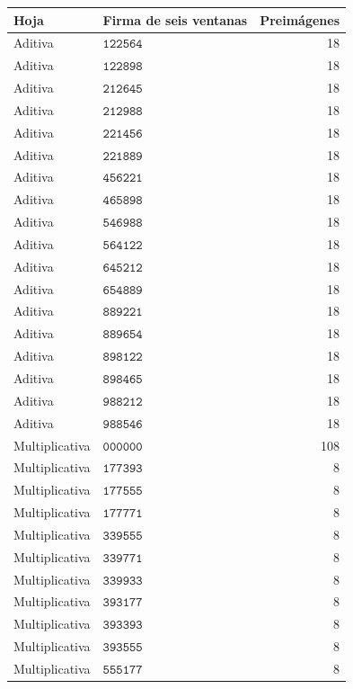 \begin{longtable}{@{}llr@{}}
\toprule Hoja&Firma de seis ventanas&Preimágenes\\\midrule\endhead
Aditiva&\(\mathtt{122564}\)&18\\
Aditiva&\(\mathtt{122898}\)&18\\
Aditiva&\(\mathtt{212645}\)&18\\
Aditiva&\(\mathtt{212988}\)&18\\
Aditiva&\(\mathtt{221456}\)&18\\
Aditiva&\(\mathtt{221889}\)&18\\
Aditiva&\(\mathtt{456221}\)&18\\
Aditiva&\(\mathtt{465898}\)&18\\
Aditiva&\(\mathtt{546988}\)&18\\
Aditiva&\(\mathtt{564122}\)&18\\
Aditiva&\(\mathtt{645212}\)&18\\
Aditiva&\(\mathtt{654889}\)&18\\
Aditiva&\(\mathtt{889221}\)&18\\
Aditiva&\(\mathtt{889654}\)&18\\
Aditiva&\(\mathtt{898122}\)&18\\
Aditiva&\(\mathtt{898465}\)&18\\
Aditiva&\(\mathtt{988212}\)&18\\
Aditiva&\(\mathtt{988546}\)&18\\
Multiplicativa&\(\mathtt{000000}\)&108\\
Multiplicativa&\(\mathtt{177393}\)&8\\
Multiplicativa&\(\mathtt{177555}\)&8\\
Multiplicativa&\(\mathtt{177771}\)&8\\
Multiplicativa&\(\mathtt{339555}\)&8\\
Multiplicativa&\(\mathtt{339771}\)&8\\
Multiplicativa&\(\mathtt{339933}\)&8\\
Multiplicativa&\(\mathtt{393177}\)&8\\
Multiplicativa&\(\mathtt{393393}\)&8\\
Multiplicativa&\(\mathtt{393555}\)&8\\
Multiplicativa&\(\mathtt{555177}\)&8\\

\end{longtable}
